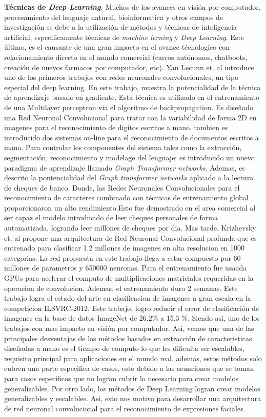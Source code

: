\textbf{Técnicas de \textit{Deep Learning}.} Muchos de los avances en visión por computador, procesamiento del lenguaje natural, bioinformatica y otros campos de investigación se debe a la utilización de métodos y técnicas de inteligencia artificial, especificamente técnicas de \textit{machine lerning} y \textit{Deep Learning}. Este último, es el causante de una gran impacto en el avance técnologico con relacionamiento directo en el mundo comercial (carros autónomos, chatboots, creación de nuevos farmacos por computador, etc).  Yan Lecunn  et. al \cite{2lecun1998gradient} introduce uno de los primeros trabajos con redes neuronales convolucionales, un tipo especial del deep learning. En este trabajo, muestra la potencialidad de la técnica de aprendizaje basado en gradiente. Esta técnica es utilizado en el entrenamiento de una Multilayer perceptron via el algoritmo de backpropagation. Es diseñado una Red Neuronal Convolucional para tratar con la variabilidad de forma 2D en imagenes para el reconocimiento de digitos escritos a mano. tambien es introducido dos sistemas on-line para el reconocimiento de documentos escritos a mano. Para controlar los componentes del sistema tales como la extracción, segmentación, reconocimiento y modelage del lenguaje; es introducido un nuevo paradigma de aprendizaje llamado \textit{Graph Transformer networks}. Ademas, es descrito la pontencialidad del \textit{Graph transformer networks} aplicado a la lectura de cheques de banco. Donde, las Redes Neuronales Convolucionales para el reconocimiento de caracteres combinado con técnicas de entrenamiento global proporcionaron un alto rendimiento.Esto fue demostrado en el area comercial al ser capaz el modelo introducido de leer cheques personales de forma automatizada, logrando leer millones de cheques por dia. Mas tarde, Krizhevsky et. al \cite{8krizhevsky2012imagenet} propone una arquitectura de Red Neuronal Convolucional profunda que es entrenado para clasificar 1.2 millones de imagenes en alta resolucion en 1000 categorias. La red propuesta en este trabajo llega a estar compuesto por 60 millones de parametros y 650000 neuronas. Para el entrenamiento fue usaada GPUs para acelerar el computo de multiplicaciones matriciales requeridas en la operacion de convolucion. Ademas, el entrenamiento duro 2 semanas.
Este trabajo logra el estado del arte en clasificacion de imagenes a gran escala en la competicion ILSVRC-2012.
Este trabajo, logro reducir el error de clasificación de imagenes en la base de datos ImageNet de 26.2\% a 15.3 \%. Siendo asi, uno de los trabajos con mas impacto en visión por computador. Asi, vemos que una de las principales desventajas de los métodos basados en extracción de caracteristicas diseñadas a mano es el tiempo de computo lo que les dificulta ser escalables, requisito principal para aplicaciones en el mundo real.
ademas, estos métodos solo cubren una parte especifica de casos, esto debido a las asunciones que se toman para casos especificos que no logran cubrir lo necesario para crear modelos generalizables. Por otro lado, los métodos de Deep Learning logran crear modelos generalizables y escalables. Asi, esto nos motivo para desarrollar una arquitectura de red neuronal convolucional para el reconocimiento de expresiones faciales.



